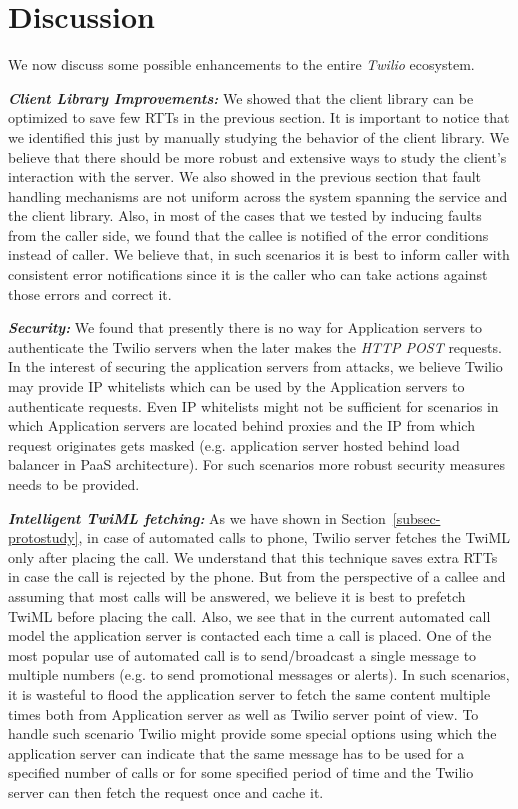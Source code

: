 \section{Discussion}
\label{sec-discussion}
We now discuss some possible enhancements to the entire \textit{Twilio} ecosystem. 

\emph{\textbf{Client Library Improvements:}}
We showed that the client library can be optimized to save few RTTs in the previous section. It is important to notice that we identified this just by manually studying the behavior of the client library. We believe that there should be more robust and extensive ways to study the client's interaction with the server. We also showed in the previous section that fault handling mechanisms are not uniform across the system spanning the service and the client library. Also, in most of the cases that we tested by inducing faults from the caller side, we found that the callee is notified of the error conditions instead of caller. We believe that, in such scenarios it is best to inform caller with consistent error notifications since it is the caller who can take actions against those errors and correct it.


\emph{\textbf{Security:}} We found that presently there is no way for Application servers to authenticate the Twilio servers when the later makes the \textit{HTTP POST} requests. In the interest of securing the application servers from attacks, we believe Twilio may provide IP whitelists which can be used by the Application servers to authenticate requests. Even IP whitelists might not be sufficient for scenarios in which Application servers are located behind proxies and the IP from which request originates gets masked (e.g. application server hosted behind load balancer in PaaS architecture). For such scenarios more robust security measures needs to be provided.

\emph{\textbf{Intelligent TwiML fetching:}} As we have shown in Section~\ref{subsec-protostudy}, in case of automated calls to phone, Twilio server fetches the TwiML only after placing the call. We understand that this technique saves extra RTTs in case the call is rejected by the phone. But from the perspective of a callee and assuming that most calls will be answered, we believe it is best to prefetch TwiML before placing the call. Also, we see that in the current automated call model the application server is contacted each time a call is placed. One of the most popular use of automated call is to send/broadcast a single message to multiple numbers (e.g. to send promotional messages or alerts). In such scenarios, it is wasteful to flood the application server to fetch the same content multiple times both from Application server as well as Twilio server point of view. To handle such scenario Twilio might provide some special options using which the application server can indicate that the same message has to be used for a specified number of calls or for some specified period of time and the Twilio server can then fetch the request once and cache it.   
 